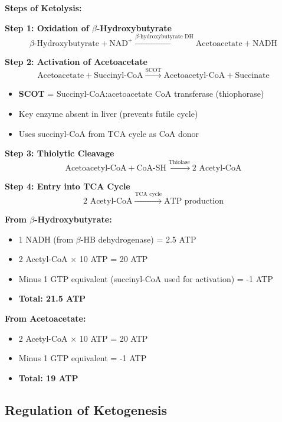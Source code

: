 \textbf{Steps of Ketolysis:}

\textbf{Step 1: Oxidation of $\beta$-Hydroxybutyrate}
\[
\beta\text{-Hydroxybutyrate} + \text{NAD}^+ \xrightarrow{\beta\text{-hydroxybutyrate DH}} \text{Acetoacetate} + \text{NADH}
\]

\textbf{Step 2: Activation of Acetoacetate}
\[
\text{Acetoacetate} + \text{Succinyl-CoA} \xrightarrow{\text{SCOT}} \text{Acetoacetyl-CoA} + \text{Succinate}
\]
\begin{itemize}
    \item \textbf{SCOT} = Succinyl-CoA:acetoacetate CoA transferase (thiophorase)
    \item Key enzyme absent in liver (prevents futile cycle)
    \item Uses succinyl-CoA from TCA cycle as CoA donor
\end{itemize}

\textbf{Step 3: Thiolytic Cleavage}
\[
\text{Acetoacetyl-CoA} + \text{CoA-SH} \xrightarrow{\text{Thiolase}} 2 \text{ Acetyl-CoA}
\]

\textbf{Step 4: Entry into TCA Cycle}
\[
2 \text{ Acetyl-CoA} \xrightarrow{\text{TCA cycle}} \text{ATP production}
\]

\begin{tcolorbox}[colback=green!5, colframe=green!70!black, title=\textbf{ATP Yield from Ketone Bodies}]
\textbf{From $\beta$-Hydroxybutyrate:}
\begin{itemize}
    \item 1 NADH (from $\beta$-HB dehydrogenase) = 2.5 ATP
    \item 2 Acetyl-CoA $\times$ 10 ATP = 20 ATP
    \item Minus 1 GTP equivalent (succinyl-CoA used for activation) = -1 ATP
    \item \textbf{Total: 21.5 ATP}
\end{itemize}

\textbf{From Acetoacetate:}
\begin{itemize}
    \item 2 Acetyl-CoA $\times$ 10 ATP = 20 ATP
    \item Minus 1 GTP equivalent = -1 ATP
    \item \textbf{Total: 19 ATP}
\end{itemize}
\end{tcolorbox}

\subsection{Regulation of Ketogenesis}

